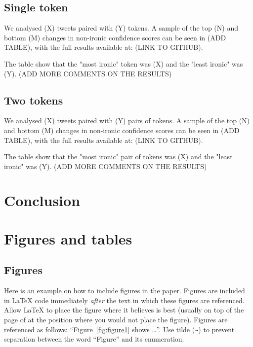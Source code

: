 \documentclass[10pt, a4paper]{article}
\begin{document}
\subsection{Single token}

We analysed (X) tweets paired with (Y) tokens. A sample of the top (N) and bottom (M) changes in non-ironic confidence scores can be seen in (ADD TABLE), with the full results available at: (LINK TO GITHUB).

The table show that the "most ironic" token was (X) and the "least ironic" was (Y). (ADD MORE COMMENTS ON THE RESULTS)

\subsection{Two tokens}

We analysed (X) tweets paired with (Y) pairs of tokens. A sample of the top (N) and bottom (M) changes in non-ironic confidence scores can be seen in (ADD TABLE), with the full results available at: (LINK TO GITHUB).

The table show that the "most ironic" pair of tokens was (X) and the "least ironic" was (Y). (ADD MORE COMMENTS ON THE RESULTS)

\section{Conclusion}


\section{Figures and tables}

\subsection{Figures}

Here is an example on how to include figures in the paper. Figures are included in \LaTeX{} code immediately \textit{after} the text in which these figures are referenced. Allow \LaTeX{} to place the figure where it believes is best (usually on top of the page of at the position where you would not place the figure). Figures are referenced as follows: ``Figure~\ref{fig:figure1} shows \dots''. Use tilde (\verb.~.) to prevent separation between the word ``Figure'' and its enumeration. 
\end{document}

